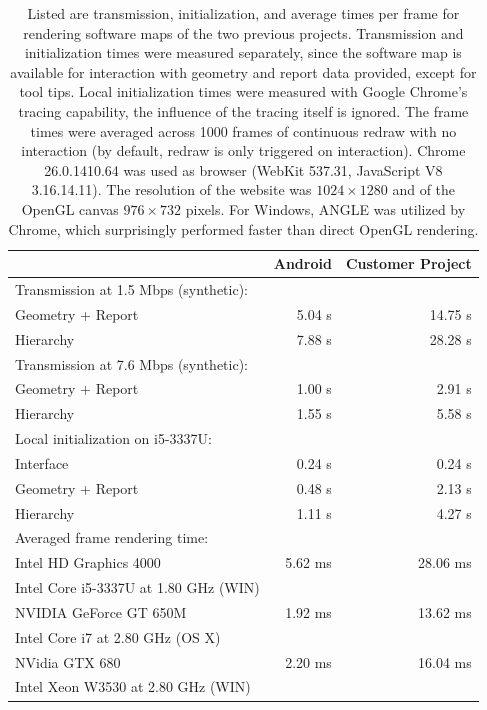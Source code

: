 \documentclass[annual]{acmsiggraph}
\begin{document}
\begin{table}[t!]
	\begin{tabular*}{\linewidth}{@{\extracolsep{\fill}}lrr}
		\toprule
			& Android & Customer Project \\
		\midrule
		\addlinespace

		\small Transmission at 1.5 Mbps (synthetic):  & & \\
		Geometry + Report  & 5.04 s & 14.75 s \\
		Hierarchy          & 7.88 s & 28.28 s \\

		\small Transmission at 7.6 Mbps (synthetic):  & & \\
		Geometry + Report  & 1.00 s &  2.91 s \\
		Hierarchy          & 1.55 s &  5.58 s \\

		\small Local initialization on i5-3337U: & & \\
		Interface          &  0.24 s  & 0.24 s \\
		Geometry + Report  &  0.48 s  & 2.13 s \\
		Hierarchy          &  1.11 s  & 4.27 s \\
		\addlinespace

		\small Averaged frame rendering time: & & \\
		Intel HD Graphics 4000      & 5.62 ms  &  28.06 ms \\
		\small Intel Core i5-3337U at 1.80 GHz (WIN) & & \\
		NVIDIA GeForce GT 650M      & 1.92 ms  &  13.62 ms \\
		\small Intel Core i7 at 2.80 GHz (OS X) & & \\
		NVidia GTX 680              & 2.20 ms  &  16.04 ms \\
		\small Intel Xeon W3530 at 2.80 GHz (WIN)   & & \\
	\bottomrule
	\end{tabular*}
	\caption{	
		Listed are transmission, initialization, and average times per frame for rendering software maps of the two previous projects.
		Transmission and initialization times were measured separately, since the software map is available for interaction with geometry and report data provided, except for tool tips.
		Local initialization times were measured with Google Chrome's tracing capability, the influence of the tracing itself is ignored.
		The frame times were averaged across 1000 frames of continuous redraw with no interaction (by default, redraw is only triggered on interaction).
		Chrome 26.0.1410.64 was used as browser (WebKit 537.31, JavaScript V8 3.16.14.11).
		The resolution of the website was $1024 \times 1280$ and of the OpenGL canvas $976 \times 732$ pixels. 
		For Windows, ANGLE was utilized by Chrome, which surprisingly performed faster than direct OpenGL rendering.
		}
	\label{tab:frametimes}
\end{table}
\end{document}
